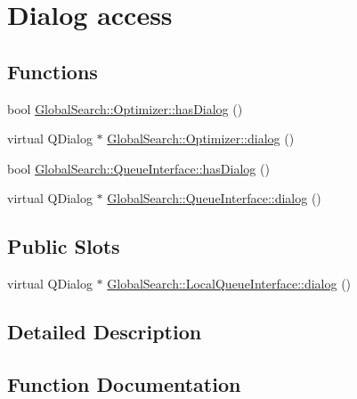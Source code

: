 \hypertarget{group__dialog}{}\section{Dialog access}
\label{group__dialog}
\subsection*{Functions}
\begin{DoxyCompactItemize}
\item 
bool \hyperlink{group__dialog_gac4335196cdf08e3555f6d0e152761604}{Global\+Search\+::\+Optimizer\+::has\+Dialog} ()
\item 
virtual Q\+Dialog $\ast$ \hyperlink{group__dialog_ga9455d181accc40edd3ca6271fdc1e050}{Global\+Search\+::\+Optimizer\+::dialog} ()
\item 
bool \hyperlink{group__dialog_gaa78e95fa76777efba3cdfd70d8e3caf9}{Global\+Search\+::\+Queue\+Interface\+::has\+Dialog} ()
\item 
virtual Q\+Dialog $\ast$ \hyperlink{group__dialog_ga4457d66b93f0406af1b595659ca25dcf}{Global\+Search\+::\+Queue\+Interface\+::dialog} ()
\end{DoxyCompactItemize}
\subsection*{Public Slots}
\begin{DoxyCompactItemize}
\item 
virtual Q\+Dialog $\ast$ \hyperlink{group__dialog_ga4bd87bf2050209a72d1a35c824e515da}{Global\+Search\+::\+Local\+Queue\+Interface\+::dialog} ()
\end{DoxyCompactItemize}


\subsection{Detailed Description}


\subsection{Function Documentation}
\hypertarget{group__dialog_ga4457d66b93f0406af1b595659ca25dcf}{}
